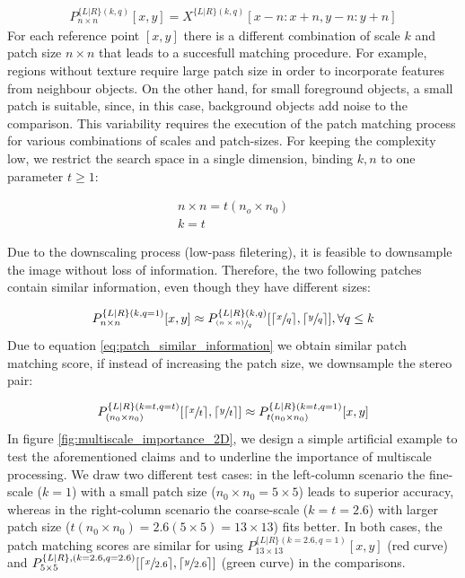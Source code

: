 \documentclass[runningheads]{llncs}
\begin{document}
\begin{gather}
    P^{ \{L|R\} (k,q)}_{n \times n}[x,y] = X^{ \{ L|R \}(k,q)} [x-n:x+n, y-n:y+n]
\end{gather}
%
For each reference point $[x,y]$ there is a different combination of scale $k$ and patch size $n \times n$ that leads to a succesfull matching procedure. For example, regions without texture require large patch size in order to incorporate features from neighbour objects. On the other hand, for small foreground objects, a small patch is suitable, since, in this case, background objects add noise to the comparison. This variability requires the execution of the patch matching process for various combinations of scales and patch-sizes. For keeping the complexity low, we restrict the search space in a single dimension, binding $k, n$ to one parameter $t\geq1$:

\begin{gather}
    n \times n = t(n_o \times n_0) \label{eq:t_param1}\\
    k = t \label{eq:t_param2}
\end{gather}

Due to the downscaling process (low-pass filetering), it is feasible to downsample the image without loss of information. Therefore, the two following patches contain similar information, even though they have different sizes:

\begin{gather} \label{eq:patch_similar_information}
    P^{ \{L|R\} (k,q=1)}_{n \times n}[x,y] \approx P^{ \{L|R\} (k,q)}_{\sfrac{(n \times n)}{q}}[\lceil \sfrac{x}{q} \rceil,\lceil \sfrac{y}{q} \rceil], \forall q \leq k
\end{gather}{}
%
Due to equation \ref{eq:patch_similar_information} we obtain similar patch matching score, if instead of increasing the patch size, we downsample the stereo pair:

\begin{gather} \label{eq:patch_similar_information1}
     P^{ \{L|R\} (k = t, q = t)}_{(n_0 \times n_0)}[\lceil \sfrac{x}{t} \rceil, \lceil \sfrac{y}{t} \rceil] \approx P^{ \{L|R\} (k = t, q = 1)}_{t(n_0 \times n_0)}[x,y] 
\end{gather}{}
%
In figure \ref{fig:multiscale_importance_2D}, we design a simple artificial example to test the aforementioned claims and to underline the importance of multiscale processing. We draw two different test cases: in the left-column scenario the fine-scale ($k=1$) with a small patch size ($n_0 \times n_0 = 5 \times 5$) leads to superior accuracy, whereas in the right-column scenario the coarse-scale ($k=t=2.6$) with larger patch size ($t(n_0 \times n_0) = 2.6(5 \times 5) =13 \times 13$) fits better. In both cases, the patch matching scores are similar for using $ P^{ \{L|R\} (k = 2.6, q = 1)}_{13 \times 13}[x,y] $ (red curve) and $P^{ \{L|R\}, (k = 2.6, q = 2.6)}_{5 \times 5}[\lceil \sfrac{x}{2.6} \rceil, \lceil \sfrac{y}{2.6} \rceil ]$ (green curve) in the comparisons.
\end{document}
